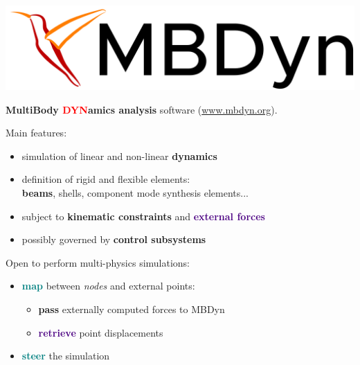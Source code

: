 \documentclass[10pt,t]{beamer}
\begin{document}
\begin{frame}{\includegraphics[width=.18\textwidth]{images/mbdyn.png} }

\textbf{\textcolor{dorange}{M}ulti\textcolor{dorange}{B}ody \textcolor{red}{DYN}amics analysis} software (\url{www.mbdyn.org}).\\


\vspace{5mm}

Main features:

    \begin{itemize}
        \item simulation of linear and non-linear \textbf{\textcolor{dorange}{dynamics}}
        \item definition of rigid and flexible elements:\\ \textbf{\textcolor{dblue}{beams}}, shells, component mode synthesis elements...
        \item subject to \textbf{\textcolor{pblue}{kinematic constraints}} and \textbf{\textcolor{indigo}{external forces}}
        \item possibly governed by \textbf{\textcolor{fgreen}{control subsystems}}
    \end{itemize}

\pause
\vspace{5mm}

Open to perform multi-physics simulations:
\begin{itemize}
    \item \textcolor{teal}{\textbf{map}} between \textit{nodes} and external points:
    \begin{itemize}
    \footnotesize
        \item \textcolor{fgreen}{\textbf{pass}} externally computed forces to MBDyn
        \item \textcolor{indigo}{\textbf{retrieve}} point displacements
    \end{itemize}
    \normalsize
    \item \textcolor{teal}{\textbf{steer}} the simulation
\end{itemize}

\end{frame}
\end{document}
